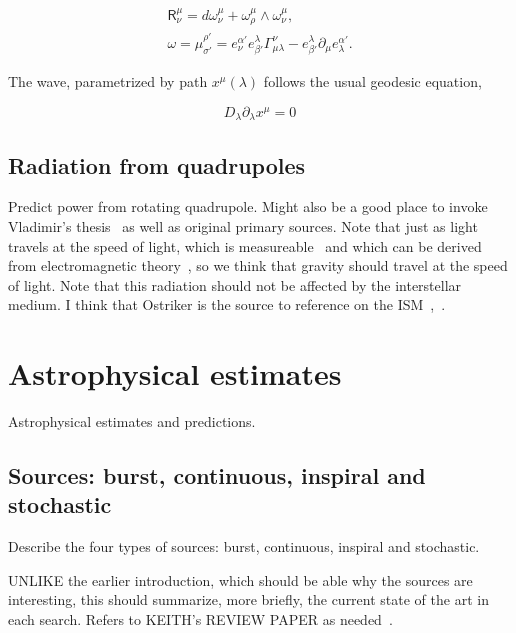 \begin{eqnarray}
\textsf{R}^\mu_\nu = d\omega^\mu_\nu + \omega^\mu_\rho \wedge \omega^\mu_\nu, \\
\omega = \mu^{\rho'}_{\sigma'} = e^{\alpha'}_{\nu} e^{\lambda}_{\beta'} \Gamma^{\nu}_{\mu\lambda} - e^{\lambda}_{\beta'} \partial_{\mu} e^{\alpha'}_{\lambda}. 
\end{eqnarray}

The wave, parametrized by path $x^\mu (\lambda)$ follows the usual geodesic equation,

\begin{equation}
D_\lambda \partial_\lambda x^\mu = 0
\end{equation}



        \subsection{Radiation from quadrupoles}
        \label{radiation}
  
            Predict power from rotating quadrupole. Might also be a good place to invoke Vladimir's thesis~\cite{DergachevThesis} as well as original primary sources. Note that just as light travels at the speed of light, which is measureable~\cite{CODATA} and which can be derived from electromagnetic theory~\cite{GriffithsE}, so we think that gravity should travel at the speed of light. Note that this radiation should not be affected by the interstellar medium. I think that Ostriker is the source to reference on the ISM~\cite{Caldwell1981},~\cite{McKee1977}.

    \section{Astrophysical estimates}
    \label{estimates}

        Astrophysical estimates and predictions.

        \subsection{Sources: burst, continuous, inspiral and stochastic}
        \label{source_types}

            Describe the four types of sources: burst, continuous, inspiral and stochastic.

            UNLIKE the earlier introduction, which should be able why the sources are interesting, this should summarize, more briefly, the current state of the art in each search. Refers to KEITH's REVIEW PAPER as needed~\cite{Riles2013}.

